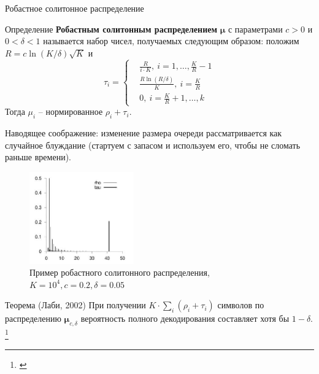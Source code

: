 \documentclass{beamer}
\begin{document}
\begin{frame}{Робастное солитонное распределение}
    \begin{block}{Определение}
        \textbf{Робастным солитонным распределением} $\boldsymbol{\mu}$
        с параметрами $c>0$ и $0<\delta<1$ называется набор чисел,
        получаемых следующим образом: положим $R=c\ln(K/\delta)\sqrt K$ и
        \[
            \tau_i
            =
            \left\{
            \begin{aligned}
                &\frac{R}{i\cdot K},\: i=1,\dots, \frac{K}{R}-1\\
                &\frac{R\ln(R/\delta)}{K},\: i=\frac{K}{R}\\
                &0,\: i=\frac{K}{R}+1,\dots,k
            \end{aligned}
            \right.
        \]
        Тогда $\mu_i$ -- нормированное $\rho_i+\tau_i$.
    \end{block}
    Наводящее соображение: изменение размера очереди рассматривается 
    как случайное блуждание (стартуем с запасом и используем его, чтобы
    не сломать раньше времени).
\end{frame}

\begin{frame}

    \begin{figure}
    \centering
        \includegraphics[width=0.4\textwidth]{img/distribution_ex.jpg}
        
        \caption{Пример робастного солитонного распределения, $K=10^4, c=0.2, \delta=0.05$}
        \label{fig:question}
    \end{figure} 

    \begin{block}{Теорема (Лаби, 2002)}
        При получении $K\cdot \sum_{i}(\rho_i+\tau_i)$ символов
        по распределению $\boldsymbol{\mu}_{c,\delta}$ 
        вероятность полного декодирования составляет хотя бы $1-\delta$.
        \footnote{\cite{Luby}}
    \end{block}

\end{frame}
\end{document}
